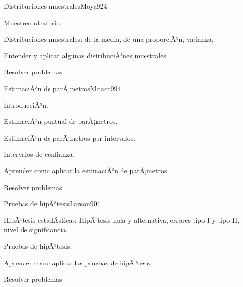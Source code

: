 \begin{syllabus}
\begin{unit}{Distribuciones muestrales}{Moya92}{4}
   \begin{topics}
         \item  Muestreo aleatorio.
	 \item  Distribuciones muestrales: de la media, de una proporciÃ³n, varianza.
   \end{topics}

   \begin{unitgoals}
         \item  Entender y aplicar algunas distribuciÃ³nes muestrales
         \item  Resolver problemas
   \end{unitgoals}
\end{unit}

\begin{unit}{EstimaciÃ³n de parÃ¡metros}{Mitacc99}{4}
   \begin{topics}
         \item  IntroducciÃ³n.
	 \item  EstimaciÃ³n puntual de parÃ¡metros.
	\item EstimaciÃ³n de parÃ¡metros por intervalos.
	\item Intervalos de confianza.
   \end{topics}

   \begin{unitgoals}
         \item  Aprender como aplicar la estimaciÃ³n de parÃ¡metros
         \item  Resolver problemas
   \end{unitgoals}
\end{unit}

\begin{unit}{Pruebas de hipÃ³tesis}{Larson90}{4}
   \begin{topics}
         \item  HipÃ³tesis estadÃ­sticas: HipÃ³tesis nula y alternativa, errores tipo I y tipo II, nivel de significancia.
	 \item  Pruebas de hipÃ³tesis.
   \end{topics}

   \begin{unitgoals}
         \item  Aprender como aplicar las pruebas de hipÃ³tesis.
         \item  Resolver problemas
   \end{unitgoals}
\end{unit}

\begin{coursebibliography}
\end{coursebibliography}

\end{syllabus}
